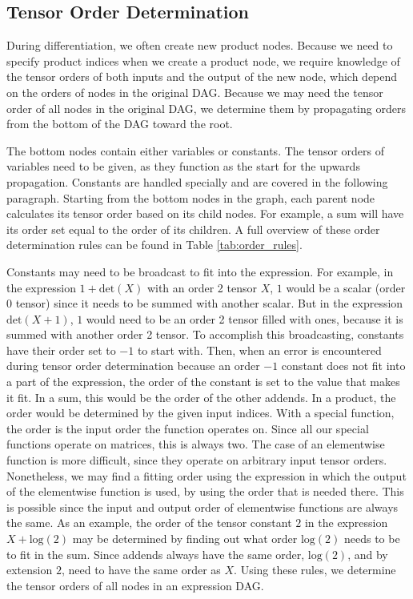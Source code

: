 \documentclass[12pt, a4paper]{report}
\begin{document}
\subsection{Tensor Order Determination}
During differentiation, we often create new product nodes.
Because we need to specify product indices when we create a product node, we require knowledge of the tensor orders of both inputs and the output of the new node, which depend on the orders of nodes in the original DAG.
Because we may need the tensor order of all nodes in the original DAG, we determine them by propagating orders from the bottom of the DAG toward the root.

The bottom nodes contain either variables or constants.
The tensor orders of variables need to be given, as they function as the start for the upwards propagation.
Constants are handled specially and are covered in the following paragraph.
Starting from the bottom nodes in the graph, each parent node calculates its tensor order based on its child nodes.
For example, a sum will have its order set equal to the order of its children.
A full overview of these order determination rules can be found in Table \ref{tab:order_rules}.

Constants may need to be broadcast to fit into the expression.
For example, in the expression $1 + \text{det}(X)$ with an order 2 tensor $X$, $1$ would be a scalar (order 0 tensor) since it needs to be summed with another scalar.
But in the expression $\text{det}(X + 1)$, $1$ would need to be an order 2 tensor filled with ones, because it is summed with another order 2 tensor.
To accomplish this broadcasting, constants have their order set to $-1$ to start with.
Then, when an error is encountered during tensor order determination because an order $-1$ constant does not fit into a part of the expression, the order of the constant is set to the value that makes it fit.
In a sum, this would be the order of the other addends.
In a product, the order would be determined by the given input indices.
With a special function, the order is the input order the function operates on. Since all our special functions operate on matrices, this is always two.
The case of an elementwise function is more difficult, since they operate on arbitrary input tensor orders.
Nonetheless, we may find a fitting order using the expression in which the output of the elementwise function is used, by using the order that is needed there.
This is possible since the input and output order of elementwise functions are always the same.
As an example, the order of the tensor constant $2$ in the expression $X + \text{log}(2)$ may be determined by finding out what order $\text{log}(2)$ needs to be to fit in the sum.
Since addends always have the same order, $\text{log}(2)$, and by extension $2$, need to have the same order as $X$.
Using these rules, we determine the tensor orders of all nodes in an expression DAG.
\end{document}
